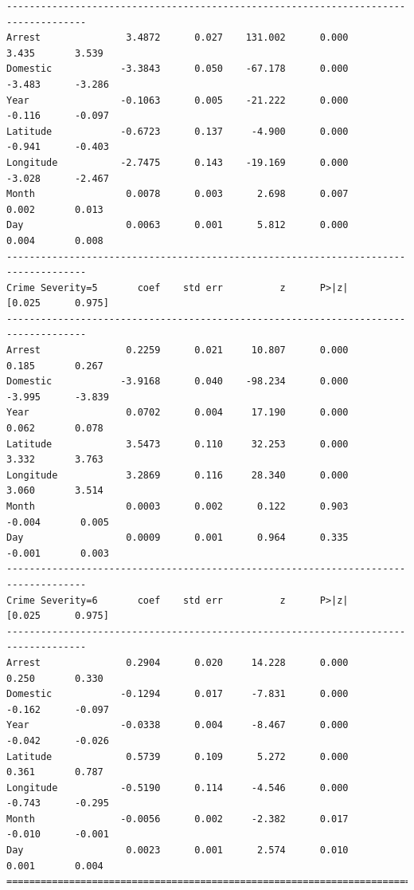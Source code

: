 \documentclass[11pt]{article}
\newcommand{\1}{\mathds{1}}
\begin{document}
\begin{Verbatim}[fontsize=\tiny]
------------------------------------------------------------------------------------
Arrest               3.4872      0.027    131.002      0.000       3.435       3.539
Domestic            -3.3843      0.050    -67.178      0.000      -3.483      -3.286
Year                -0.1063      0.005    -21.222      0.000      -0.116      -0.097
Latitude            -0.6723      0.137     -4.900      0.000      -0.941      -0.403
Longitude           -2.7475      0.143    -19.169      0.000      -3.028      -2.467
Month                0.0078      0.003      2.698      0.007       0.002       0.013
Day                  0.0063      0.001      5.812      0.000       0.004       0.008
------------------------------------------------------------------------------------
Crime Severity=5       coef    std err          z      P>|z|      [0.025      0.975]
------------------------------------------------------------------------------------
Arrest               0.2259      0.021     10.807      0.000       0.185       0.267
Domestic            -3.9168      0.040    -98.234      0.000      -3.995      -3.839
Year                 0.0702      0.004     17.190      0.000       0.062       0.078
Latitude             3.5473      0.110     32.253      0.000       3.332       3.763
Longitude            3.2869      0.116     28.340      0.000       3.060       3.514
Month                0.0003      0.002      0.122      0.903      -0.004       0.005
Day                  0.0009      0.001      0.964      0.335      -0.001       0.003
------------------------------------------------------------------------------------
Crime Severity=6       coef    std err          z      P>|z|      [0.025      0.975]
------------------------------------------------------------------------------------
Arrest               0.2904      0.020     14.228      0.000       0.250       0.330
Domestic            -0.1294      0.017     -7.831      0.000      -0.162      -0.097
Year                -0.0338      0.004     -8.467      0.000      -0.042      -0.026
Latitude             0.5739      0.109      5.272      0.000       0.361       0.787
Longitude           -0.5190      0.114     -4.546      0.000      -0.743      -0.295
Month               -0.0056      0.002     -2.382      0.017      -0.010      -0.001
Day                  0.0023      0.001      2.574      0.010       0.001       0.004
====================================================================================  
\end{Verbatim}
\end{document}

